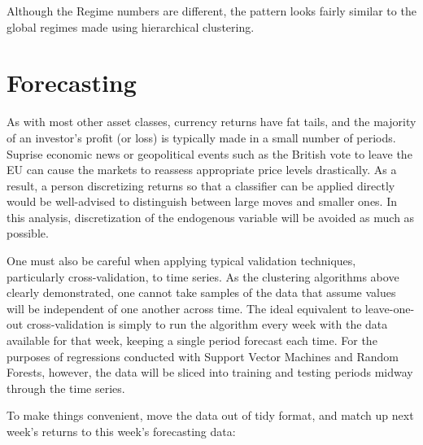 \documentclass[]{article}
\newenvironment{Shaded}{\begin{snugshade}}{\end{snugshade}}
\newcommand{\KeywordTok}[1]{\textcolor[rgb]{0.13,0.29,0.53}{\textbf{#1}}}
\newcommand{\DataTypeTok}[1]{\textcolor[rgb]{0.13,0.29,0.53}{#1}}
\newcommand{\DecValTok}[1]{\textcolor[rgb]{0.00,0.00,0.81}{#1}}
\newcommand{\StringTok}[1]{\textcolor[rgb]{0.31,0.60,0.02}{#1}}
\newcommand{\CommentTok}[1]{\textcolor[rgb]{0.56,0.35,0.01}{\textit{#1}}}
\newcommand{\OperatorTok}[1]{\textcolor[rgb]{0.81,0.36,0.00}{\textbf{#1}}}
\newcommand{\NormalTok}[1]{#1}
\begin{document}
Although the Regime numbers are different, the pattern looks fairly
similar to the global regimes made using hierarchical clustering.

\section{Forecasting}\label{forecasting}

As with most other asset classes, currency returns have fat tails, and
the majority of an investor's profit (or loss) is typically made in a
small number of periods. Suprise economic news or geopolitical events
such as the British vote to leave the EU can cause the markets to
reassess appropriate price levels drastically. As a result, a person
discretizing returns so that a classifier can be applied directly would
be well-advised to distinguish between large moves and smaller ones. In
this analysis, discretization of the endogenous variable will be avoided
as much as possible.

One must also be careful when applying typical validation techniques,
particularly cross-validation, to time series. As the clustering
algorithms above clearly demonstrated, one cannot take samples of the
data that assume values will be independent of one another across time.
The ideal equivalent to leave-one-out cross-validation is simply to run
the algorithm every week with the data available for that week, keeping
a single period forecast each time. For the purposes of regressions
conducted with Support Vector Machines and Random Forests, however, the
data will be sliced into training and testing periods midway through the
time series.

To make things convenient, move the data out of tidy format, and match
up next week's returns to this week's forecasting data:

\begin{Shaded}
\end{Shaded}
\end{document}
